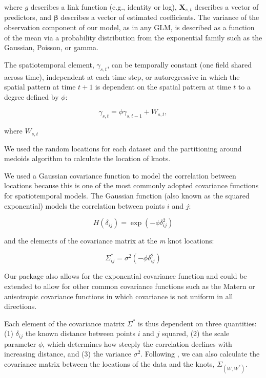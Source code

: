 \documentclass[12pt,english]{article}
\begin{document}
\begin{spacing}{1.05}
\noindent where $g$ describes a link function (e.g., identity or log),
$\bm{X}_{s,t}$ describes a vector of predictors, and $\bm{\beta}$ describes a
vector of estimated coefficients. The variance of the observation component of
our model, as in any GLM, is described as a function of the mean via a
probability distribution from the exponential family such as the Gaussian,
Poisson, or gamma. 

The spatiotemporal element, $\gamma_{s,t}$, can be temporally constant (one
field shared across time), independent at each time step, or autoregressive in
which the spatial pattern at time $t+1$ is dependent on the spatial
pattern at time $t$ to a degree defined by $\phi$:

\begin{equation}
  \gamma_{s,t} = \phi \gamma_{s,t-1} + W_{s,t},
\end{equation}

where $W_{s,t}$



We used the random locations for each dataset 
and the partitioning around medoids algorithm
\citep[\texttt{pam()} in the R package \textbf{cluster};][]{reynolds2006}
to calculate the location of knots. 

We used a Gaussian covariance function to model the correlation between
locations because this is one of the most commonly adopted covariance functions
for spatiotemporal models. The Gaussian function (also known as the squared
exponential) models the correlation between points $i$ and $j$:

\begin{equation}
H(\delta_{ij}) = \exp \left(-\phi \delta_{ij}^2 \right)
\end{equation}

and the elements of the covariance matrix at the \emph{m} knot locations:

\begin{equation}
\Sigma_{ij}^*=\sigma^2 \left( -\phi \delta_{ij}^2 \right)
\end{equation}

Our package also allows for the exponential covariance function and could be
extended to allow for other common covariance functions such as the Matern or
anisotropic covariance functions in which covariance is not uniform in all
directions. 

Each element of the covariance matrix $\Sigma^*$ is thus dependent on
three quantities: (1) $\delta_{ij}$ the known distance between points $i$ and
$j$ squared, (2) the scale parameter $\phi$, which determines how steeply the
correlation declines with increasing distance, and (3) the variance $\sigma^2$.
Following \citep{latimer2009}, we can also calculate the covariance matrix
between the locations of the data and the knots, 
$\Sigma_{\left(W, W^* \right)}$. 


\end{spacing}
\end{document}
